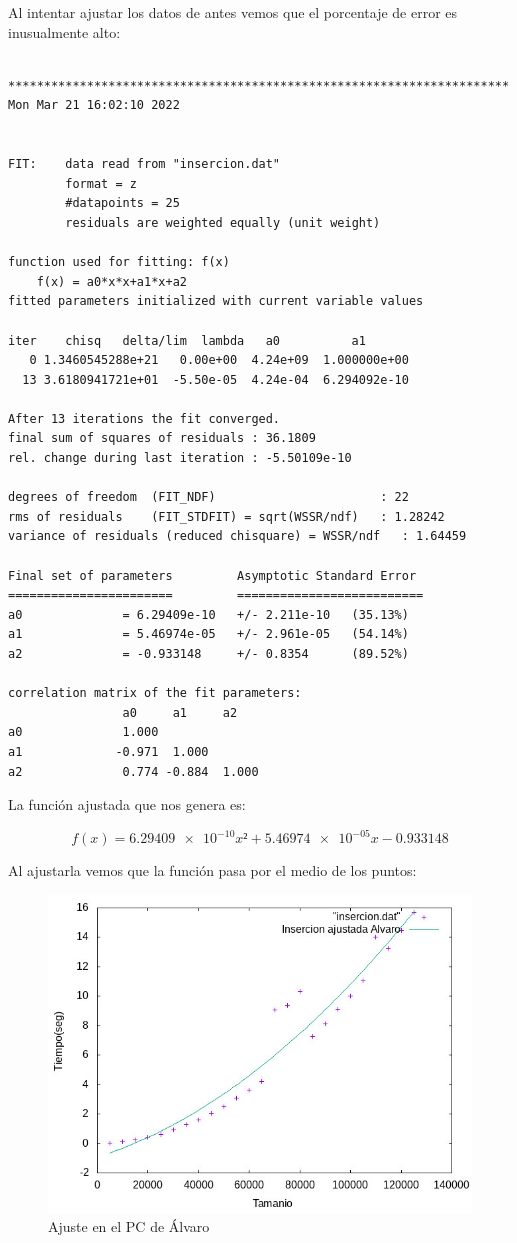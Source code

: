 \documentclass[12pt, spanish]{article}
\begin{document}
Al intentar ajustar los datos de antes vemos que el porcentaje de error es inusualmente alto:
\begin{verbatim}
 **********************************************************************
Mon Mar 21 16:02:10 2022


FIT:	data read from "insercion.dat"
    	format = z
    	#datapoints = 25
    	residuals are weighted equally (unit weight)

function used for fitting: f(x)
    f(x) = a0*x*x+a1*x+a2
fitted parameters initialized with current variable values

iter  	chisq   delta/lim  lambda   a0        	a1
   0 1.3460545288e+21   0.00e+00  4.24e+09	1.000000e+00
  13 3.6180941721e+01  -5.50e-05  4.24e-04	6.294092e-10

After 13 iterations the fit converged.
final sum of squares of residuals : 36.1809
rel. change during last iteration : -5.50109e-10

degrees of freedom	(FIT_NDF)                    	: 22
rms of residuals  	(FIT_STDFIT) = sqrt(WSSR/ndf)	: 1.28242
variance of residuals (reduced chisquare) = WSSR/ndf   : 1.64459

Final set of parameters        	Asymptotic Standard Error
=======================        	==========================
a0          	= 6.29409e-10  	+/- 2.211e-10	(35.13%)
a1          	= 5.46974e-05  	+/- 2.961e-05	(54.14%)
a2          	= -0.933148    	+/- 0.8354   	(89.52%)

correlation matrix of the fit parameters:
                a0     a1     a2
a0              1.000
a1             -0.971  1.000
a2              0.774 -0.884  1.000
\end{verbatim}

La función ajustada que nos genera es:

\[f(x)=\num{6.29409e-10}x² + \num{5.46974e-05}x - 0.933148\]

\newpage

Al ajustarla vemos que la función pasa por el medio de los puntos:
\begin{figure}[H]
  \centering
  \includegraphics[scale = 0.8]{AjusteAlvaro.png}
  \caption{Ajuste en el PC de Álvaro}
\end{figure}
\end{document}
